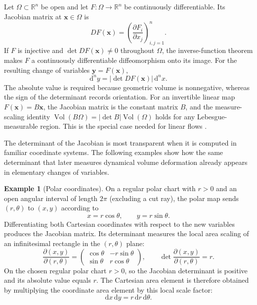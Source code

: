 \documentclass[11pt,a4paper]{article}
\newcommand{\be}{\begin{equation}}
\newcommand{\ee}{\end{equation}}
\newcommand{\lb}[1]{\label{#1}}
\newcommand{\dd}{\mathrm{d}}
\newcommand{\R}{\mathbb{R}}
\DeclareMathOperator{\Vol}{Vol}
\theoremstyle{definition}
\newtheorem{example}{Example}[section]
\numberwithin{equation}{section}
\begin{document}
Let $\Omega\subset\R^n$ be open and let $F:\Omega\rightarrow\R^n$ be continuously differentiable. Its Jacobian matrix at $\mathbf{x}\in\Omega$ is
\be
DF(\mathbf{x})=
\left(
\frac{\partial F_i}{\partial x_j}
\right)_{i,j=1}^{n}.
\lb{eq:jacobian}
\ee
If $F$ is injective and $\det DF(\mathbf x)\ne0$ throughout $\Omega$, the inverse-function theorem makes $F$ a continuously differentiable diffeomorphism onto its image. For the resulting change of variables $\mathbf y=F(\mathbf x)$,
\be
\dd^n y
=
|\det DF(\mathbf{x})|\,\dd^n x.
\lb{eq:volume-element}
\ee
The absolute value is required because geometric volume is nonnegative, whereas the sign of the determinant records orientation. For an invertible linear map $F(\mathbf x)=B\mathbf x$, the Jacobian matrix is the constant matrix $B$, and the measure-scaling identity $\Vol(B\Omega)=|\det B|\Vol(\Omega)$ holds for any Lebesgue-measurable region. This is the special case needed for linear flows \cite{apostol1969}.

The determinant of the Jacobian is most transparent when it is computed in familiar coordinate systems. The following examples show how the same determinant that later measures dynamical volume deformation already appears in elementary changes of variables.

\begin{example}[Polar coordinates]
On a regular polar chart with $r>0$ and an open angular interval of length $2\pi$ (excluding a cut ray), the polar map sends $(r,\theta)$ to $(x,y)$ according to
\be
x=r\cos\theta,
\qquad
y=r\sin\theta.
\lb{eq:polar-map}
\ee
Differentiating both Cartesian coordinates with respect to the new variables produces the Jacobian matrix. Its determinant measures the local area scaling of an infinitesimal rectangle in the $(r,\theta)$ plane:
\be
\frac{\partial(x,y)}{\partial(r,\theta)}
=
\begin{pmatrix}
\cos\theta & -r\sin\theta\\
\sin\theta & r\cos\theta
\end{pmatrix},
\qquad
\det\frac{\partial(x,y)}{\partial(r,\theta)}=r.
\lb{eq:polar-jacobian}
\ee
On the chosen regular polar chart $r>0$, so the Jacobian determinant is positive and its absolute value equals $r$. The Cartesian area element is therefore obtained by multiplying the coordinate area element by this local scale factor:
\be
\dd x\,\dd y=r\,\dd r\,\dd\theta.
\lb{eq:polar-area}
\ee
\end{example}
\end{document}
